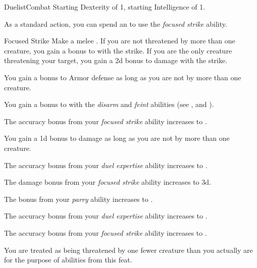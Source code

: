    \begin{feat}{Duelist}{Combat}
        \featpre Starting Dexterity of 1, starting Intelligence of 1.

         As a standard action, you can spend an  to use the \textit{focused strike} ability.
        \begin{ability}{Focused Strike}
            Make a melee .
            If you are not threatened by more than one creature, you gain a  bonus to  with the strike.
            If you are the only creature threatening your target, you gain a \plus2d bonus to damage with the strike.
        \end{ability}

         You gain a  bonus to Armor defense as long as you are not  by more than one creature.

         You gain a  bonus to  with the \textit{disarm} and \textit{feint} abilities (see , and ).

         The accuracy bonus from your \textit{focused strike} ability increases to .

         You gain a \plus1d bonus to damage as long as you are not  by more than one creature.

         The accuracy bonus from your \textit{duel expertise} ability increases to . 

         The damage bonus from your \textit{focused strike} ability increases to \plus3d.

         The bonus from your \textit{parry} ability increases to .

         The accuracy bonus from your \textit{duel expertise} ability increases to . 

         The accuracy bonus from your \textit{focused strike} ability increases to .

         You are treated as being threatened by one fewer creature than you actually are for the purpose of abilities from this feat.
    \end{feat}

